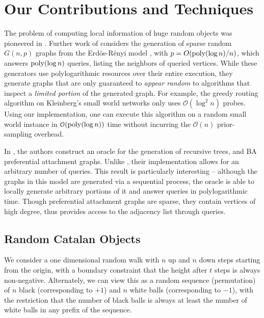 \section{Our Contributions and Techniques}
\label{sec:our_contributions_and_techniques}

The problem of computing local information of huge random objects was pioneered in \cite{huge_old,huge}.
Further work of \cite{sparse} considers the generation of sparse random $G(n,p)$ graphs from the Erd\"{o}s-R\'{e}nyi model \cite{er},
with $p = O(\mathrm{poly}(\log n)/n)$, which answers $\mathrm{poly}(\log n)$  queries, listing the neighbors of queried vertices.
While these generators use polylogarithmic resources over their entire execution,
they generate graphs that are  only guaranteed to {\em appear random} to algorithms that inspect a {\em limited portion} of the generated graph.
For example, the greedy routing algorithm on Kleinberg's small world networks \cite{kleinberg} only uses $\mathcal O(\log^2 n)$ probes.
Using our implementation, one can execute this algorithm on a random small world instance
in $\mathcal O(\mathrm{poly}(\log n))$ time without incurring the $\mathcal O(n)$ prior-sampling overhead.

In \cite{reut}, the authors construct an oracle for the generation of recursive trees, and BA preferential attachment graphs.
Unlike \cite{sparse}, their implementation allows for an arbitrary number of queries.
This result is particularly interesting --  although the graphs in this model are generated via a sequential process,
the oracle is able to locally generate arbitrary portions of it and answer queries in polylogarithmic time.
Though preferential attachment graphs are sparse, they contain vertices of high degree,
thus \cite{reut} provides access to the adjacency list through  queries.










\subsection{Random Catalan Objects}
\label{sec:overview_catalan_objects}
We consider a one dimensional random walk with $n$ up and $n$ down steps starting from the origin,
with a boundary constraint that the height after $t$ steps is always non-negative.
Alternately, we can view this as a random sequence (permutation) of $n$ black (corresponding to $+1$) and $n$ white balls (corresponding to $-1$),
with the restriction that the number of black balls is always at least the number of white balls in any prefix of the sequence.

